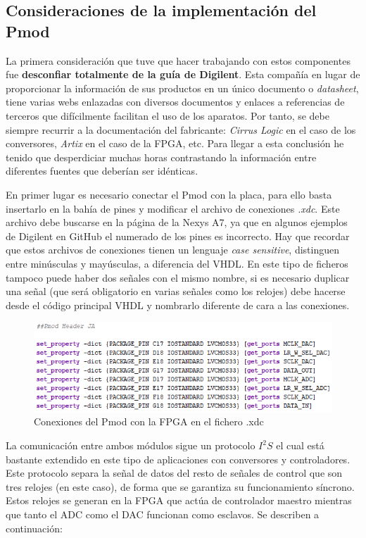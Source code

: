 \subsection{Consideraciones de la implementación del Pmod}
La primera consideración que tuve que hacer trabajando con estos componentes fue \textbf{desconfiar totalmente de la guía de Digilent}. Esta compañía en lugar de proporcionar la información de sus productos en un único documento o \emph{datasheet}, tiene varias webs enlazadas con diversos documentos y enlaces a referencias de terceros que difícilmente facilitan el uso de los aparatos. Por tanto, se debe siempre recurrir a la documentación del fabricante: \emph{Cirrus Logic} en el caso de los conversores, \emph{Artix} en el caso de la FPGA, etc. Para llegar a esta conclusión he tenido que desperdiciar muchas horas contrastando la información entre diferentes fuentes que deberían ser idénticas.

En primer lugar es necesario conectar el Pmod con la placa, para ello basta insertarlo en la bahía de pines y modificar el archivo de conexiones \emph{.xdc}. Este archivo debe buscarse en la página de la Nexys A7, ya que en algunos ejemplos de Digilent en GitHub el numerado de los pines es incorrecto. Hay que recordar que estos archivos de conexiones tienen un lenguaje \emph{case sensitive}, distinguen entre minúsculas y mayúsculas, a diferencia del VHDL. En este tipo de ficheros tampoco puede haber dos señales con el mismo nombre, si es necesario duplicar una señal (que será obligatorio en varias señales como los relojes) debe hacerse desde el código principal VHDL y nombrarlo diferente de cara a las conexiones. 

\begin{figure}[!ht]
\begin{center}
\includegraphics[width=12cm]{img/xdc.png}
\caption{\label{fig:xdc}Conexiones del Pmod con la FPGA en el fichero .xdc}
\end{center}
\end{figure}

La comunicación entre ambos módulos sigue un protocolo $I^{2}S$ \cite{i2s} el cual está bastante extendido en este tipo de aplicaciones con conversores y controladores. Este protocolo separa la señal de datos del resto de señales de control que son tres relojes (en este caso), de forma que se garantiza su funcionamiento síncrono. Estos relojes se generan en la FPGA que actúa de controlador maestro mientras que tanto el ADC como el DAC funcionan como esclavos. Se describen a continuación:

